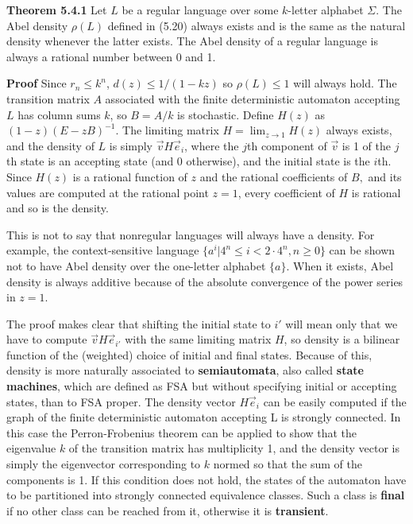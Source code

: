 \smallskip
\noindent
{\bf Theorem 5.4.1} Let $L$ be a regular language over some $k$-letter alphabet
$\Sigma$. The Abel density $\rho(L)$ defined in (5.20) always exists and is
the same as the natural density whenever the latter exists. The Abel density
of a regular language is always a rational number between 0 and 1.

\smallskip
\noindent 
{\bf Proof} Since $r_n \leq k^n$, $d(z) \leq 1/(1-kz)$ so $\rho(L) \leq 1$
will always hold. The transition matrix $A$ associated with the finite
deterministic automaton accepting $L$ has column sums $k$, so $B=A/k$ is
stochastic. Define $H(z)$ as $(1-z)(E-zB)^{-1}$.  The limiting matrix
$H=\lim_{z \rightarrow 1} H(z)$ always exists, and the density of $L$ is
simply $\vec{v}H\vec{e}_i$, where the $j$th component of $\vec{v}$ is 1 of the
$j$th state is an accepting state (and 0 otherwise), and the initial state is
the $i$th. Since $H(z)$ is a rational function of $z$ and the rational
coefficients of $B,$ and its values are computed at the rational point $z=1$,
every coefficient of $H$ is rational and so is the density. 

This is not to say that nonregular languages will always have a density. For
example, the context-sensitive language $\{a^i | 4^n \leq i < 2 \cdot 4^n, n
\geq 0\}$ can be shown not to have Abel density over the one-letter alphabet
$\{a\}$.  When it exists, Abel density is always additive because of the
absolute convergence of the power series in $z=1$. 

The proof makes clear that shifting the initial state to $i'$ will mean only
that we have to compute $\vec{v}H\vec{e}_{i'}$ with the same limiting matrix
$H$, so density is a bilinear function of the (weighted) choice of initial and
final states. Because of this, density is more naturally associated to {\bf
  semiautomata}, also called {\bf state
  machines}, which are defined as FSA but without
specifying initial or accepting states, than to FSA proper. The density vector
$H\vec{e}_i$ can be easily computed if the graph of the finite deterministic
automaton accepting L is strongly connected. In this case the Perron-Frobenius
theorem can be applied to show that the eigenvalue $k$ of the transition
matrix has multiplicity 1, and the density vector is simply the eigenvector
corresponding to $k$ normed so that the sum of the components is 1.  If this
condition does not hold, the states of the automaton have to be partitioned
into strongly connected equivalence classes. Such a class is {\bf final} if no
other class can be reached from it, otherwise it is {\bf
  transient}.

